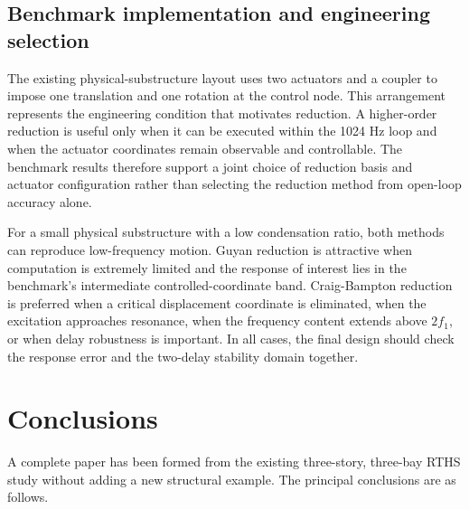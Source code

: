 \documentclass[11pt,a4paper]{article}
\begin{document}
\subsection{Benchmark implementation and engineering selection}

The existing physical-substructure layout uses two actuators and a coupler to impose one translation and one rotation at the control node. This arrangement represents the engineering condition that motivates reduction. A higher-order reduction is useful only when it can be executed within the 1024 Hz loop and when the actuator coordinates remain observable and controllable. The benchmark results therefore support a joint choice of reduction basis and actuator configuration rather than selecting the reduction method from open-loop accuracy alone.

For a small physical substructure with a low condensation ratio, both methods can reproduce low-frequency motion. Guyan reduction is attractive when computation is extremely limited and the response of interest lies in the benchmark's intermediate controlled-coordinate band. Craig-Bampton reduction is preferred when a critical displacement coordinate is eliminated, when the excitation approaches resonance, when the frequency content extends above $2f_1$, or when delay robustness is important. In all cases, the final design should check the response error and the two-delay stability domain together.

\section{Conclusions}

A complete paper has been formed from the existing three-story, three-bay RTHS study without adding a new structural example. The principal conclusions are as follows.
\end{document}
